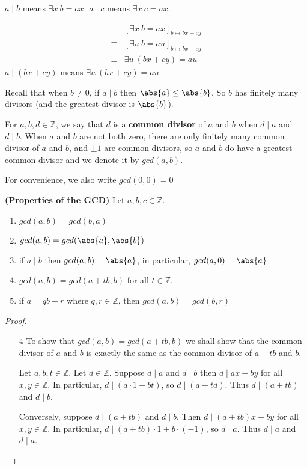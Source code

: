 \begin{rem}
$a\mid b$ means $\exists x \ b = ax$. $a\mid c$ means $\exists x \ c = ax$.

\begin{align*}
    &[\exists x \ b = ax]_{b\mapsto bx+cy}\\
    \equiv&[\exists u \ b = au]_{b\mapsto bx+cy}\\
    \equiv&\exists u \ (bx+cy)= au
\end{align*}
$a\mid (bx+cy)$ means $\exists u \ (bx+cy)= au$
\end{rem}

\begin{rem}
    Recall that when $b\neq 0$, if $a\mid b$ then $\abs{a} \leq \abs{b}$. So $b$ has finitely many divisors (and the greatest divisor is $\abs{b}$).
\end{rem}

\begin{defn}
    For $a,b,d\in\mathbb{Z}$, we say that $d$ is a \textbf{common divisor} of $a$ and $b$ when $d\mid a$ and $d\mid b$. When $a$ and $b$ are not both zero, there are only finitely many common divisor of $a$ and $b$, and $\pm 1$ are common divisors, so $a$ and $b$ do have a greatest common divisor and we denote it by $gcd(a,b)$.
    
    For convenience, we also write $gcd(0,0) = 0$
\end{defn}

\begin{thm}\textbf{(Properties of the GCD)}
Let $a,b,c\in\mathbb{Z}$.
\begin{enumerate}
\item $gcd(a,b) = gcd(b,a)$
\item $gcd(a,b) = gcd(\abs{a},\abs{b})$
\item if $a\mid b$ then $gcd(a,b) = \abs{a}$, in particular, $gcd(a,0) = \abs{a}$
\item $gcd(a,b) = gcd(a+tb,b)$ for all $t\in\mathbb{Z}$.
\item if $a=qb + r$ where $q,r\in\mathbb{Z}$, then $gcd(a,b) = gcd(b,r)$
\end{enumerate}
\end{thm}

\begin{proof}
\begin{enumerate}
\item[4] To show that $gcd(a,b) = gcd(a+tb,b)$ we shall show that the common divisor of $a$ and $b$ is exactly the same as the common divisor of $a+tb$ and $b$. 

Let $a,b,t\in\mathbb{Z}$. Let $d\in\mathbb{Z}$. Suppose $d\mid a$ and $d\mid b$ then $d\mid ax+by$ for all $x,y\in\mathbb{Z}$. In particular, $d\mid (a\cdot 1+bt)$, so $d\mid (a+td)$. Thus $d\mid (a+tb)$ and $d\mid b$.

Conversely, suppose $d\mid (a+tb)$ and $d\mid b$. Then $d\mid (a+tb) x + by$  for all $x,y\in\mathbb{Z}$. In particular, $d\mid (a+tb)\cdot 1 + b\cdot (-1) $, so $d\mid a$. Thus $d\mid a$ and $d\mid a$. 
\end{enumerate}
\end{proof}